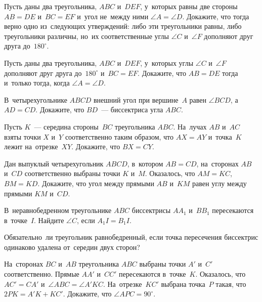 


\begin{problems}

\item
Пусть даны два треугольника, $ABC$ и~$DEF$, у~которых равны две стороны
$AB = DE$ и~$BC = EF$ и~угол не~между ними $\angle A = \angle D$.
Докажите, что тогда верно одно из~следующих утверждений: либо эти треугольники
равны, либо треугольники различны, но~их соответственные углы $\angle C$
и~$\angle F$ дополняют друг друга до~$180^{\circ}$.

\item
Пусть даны два треугольника, $ABC$ и~$DEF$, у~которых углы $\angle C$
и~$\angle F$ дополняют друг друга до~$180^\circ$ и~$BC = EF$.
Докажите, что $AB = DE$ тогда и~только тогда, когда $\angle A = \angle D$.

\item
В~четырехугольнике $ABCD$ внешний угол при вершине~$A$ равен $\angle BCD$,
а~$AD = CD$.
Докажите, что $BD$~--- биссектриса угла $ABC$.

\item
Пусть $K$~--- середина стороны~$BC$ треугольника $ABC$.
На~лучах $AB$ и~$AC$ взяты точки $X$ и~$Y$ соответственно таким образом, что
$AX = AY$ и~точка~$K$ лежит на~отрезке~$XY$.
Докажите, что $BX = CY$.

\item
Дан выпуклый четырехугольник $ABCD$, в~котором $AB = CD$, на~сторонах $AB$
и~$CD$ соответственно выбраны точки $K$ и~$M$.
Оказалось, что $AM = KC$, $BM = KD$.
Докажите, что угол между прямыми $AB$ и~$KM$ равен углу между прямыми $KM$
и~$CD$.

\item
В~неравнобедренном треугольнике $ABC$ биссектрисы $AA_{1}$ и~$BB_{1}$
пересекаются в~точке~$I$.
Найдите $\angle C$, если $A_{1}I = B_{1}I$.

\item
Обязательно~ли треугольник равнобедренный, если точка пересечения биссектрис
одинаково удалена от~середин двух сторон?

\item
На~сторонах $BC$ и~$AB$ треугольника $ABC$ выбраны точки $A'$ и~$C'$
соответственно.
Прямые $AA'$ и~$CC'$ пересекаются в~точке~$K$.
Оказалось, что $AC' = CA'$ и~$\angle ABC = \angle A'KC$.
На~отрезке~$KC'$ выбрана точка~$P$ такая, что $2 PK = A'K + KC'$.
Докажите, что $\angle APC = 90^{\circ}$.

\end{problems}

